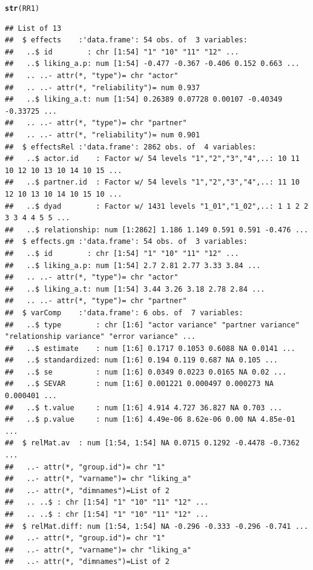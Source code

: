 \documentclass[a4paper]{article}\usepackage[]{graphicx}\usepackage[]{color}
\makeatletter
\newcommand{\hlstd}[1]{\textcolor[rgb]{0.345,0.345,0.345}{#1}}%
\newcommand{\hlkwd}[1]{\textcolor[rgb]{0.737,0.353,0.396}{\textbf{#1}}}%
\newenvironment{kframe}{%
 \def\at@end@of@kframe{}%
 \ifinner\ifhmode%
  \def\at@end@of@kframe{\end{minipage}}%
  \begin{minipage}{\columnwidth}%
 \fi\fi%
 \def\FrameCommand##1{\hskip\@totalleftmargin \hskip-\fboxsep
 \colorbox{shadecolor}{##1}\hskip-\fboxsep
     \hskip-\linewidth \hskip-\@totalleftmargin \hskip\columnwidth}%
 \MakeFramed {\advance\hsize-\width
   \@totalleftmargin\z@ \linewidth\hsize
   \@setminipage}}%
 {\par\unskip\endMakeFramed%
 \at@end@of@kframe}
\newenvironment{knitrout}{}{} %
\makeatother
\begin{document}
\begin{knitrout}\small
{}\color{fgcolor}\begin{kframe}
\begin{alltt}
\hlkwd{str}\hlstd{(RR1)}
\end{alltt}
\begin{verbatim}
## List of 13
##  $ effects    :'data.frame':	54 obs. of  3 variables:
##   ..$ id        : chr [1:54] "1" "10" "11" "12" ...
##   ..$ liking_a.p: num [1:54] -0.477 -0.367 -0.406 0.152 0.663 ...
##   .. ..- attr(*, "type")= chr "actor"
##   .. ..- attr(*, "reliability")= num 0.937
##   ..$ liking_a.t: num [1:54] 0.26389 0.07728 0.00107 -0.40349 -0.33725 ...
##   .. ..- attr(*, "type")= chr "partner"
##   .. ..- attr(*, "reliability")= num 0.901
##  $ effectsRel :'data.frame':	2862 obs. of  4 variables:
##   ..$ actor.id    : Factor w/ 54 levels "1","2","3","4",..: 10 11 10 12 10 13 10 14 10 15 ...
##   ..$ partner.id  : Factor w/ 54 levels "1","2","3","4",..: 11 10 12 10 13 10 14 10 15 10 ...
##   ..$ dyad        : Factor w/ 1431 levels "1_01","1_02",..: 1 1 2 2 3 3 4 4 5 5 ...
##   ..$ relationship: num [1:2862] 1.186 1.149 0.591 0.591 -0.476 ...
##  $ effects.gm :'data.frame':	54 obs. of  3 variables:
##   ..$ id        : chr [1:54] "1" "10" "11" "12" ...
##   ..$ liking_a.p: num [1:54] 2.7 2.81 2.77 3.33 3.84 ...
##   .. ..- attr(*, "type")= chr "actor"
##   ..$ liking_a.t: num [1:54] 3.44 3.26 3.18 2.78 2.84 ...
##   .. ..- attr(*, "type")= chr "partner"
##  $ varComp    :'data.frame':	6 obs. of  7 variables:
##   ..$ type        : chr [1:6] "actor variance" "partner variance" "relationship variance" "error variance" ...
##   ..$ estimate    : num [1:6] 0.1717 0.1053 0.6088 NA 0.0141 ...
##   ..$ standardized: num [1:6] 0.194 0.119 0.687 NA 0.105 ...
##   ..$ se          : num [1:6] 0.0349 0.0223 0.0165 NA 0.02 ...
##   ..$ SEVAR       : num [1:6] 0.001221 0.000497 0.000273 NA 0.000401 ...
##   ..$ t.value     : num [1:6] 4.914 4.727 36.827 NA 0.703 ...
##   ..$ p.value     : num [1:6] 4.49e-06 8.62e-06 0.00 NA 4.85e-01 ...
##  $ relMat.av  : num [1:54, 1:54] NA 0.0715 0.1292 -0.4478 -0.7362 ...
##   ..- attr(*, "group.id")= chr "1"
##   ..- attr(*, "varname")= chr "liking_a"
##   ..- attr(*, "dimnames")=List of 2
##   .. ..$ : chr [1:54] "1" "10" "11" "12" ...
##   .. ..$ : chr [1:54] "1" "10" "11" "12" ...
##  $ relMat.diff: num [1:54, 1:54] NA -0.296 -0.333 -0.296 -0.741 ...
##   ..- attr(*, "group.id")= chr "1"
##   ..- attr(*, "varname")= chr "liking_a"
##   ..- attr(*, "dimnames")=List of 2

\end{verbatim}
\end{kframe}
\end{knitrout}
\end{document}

